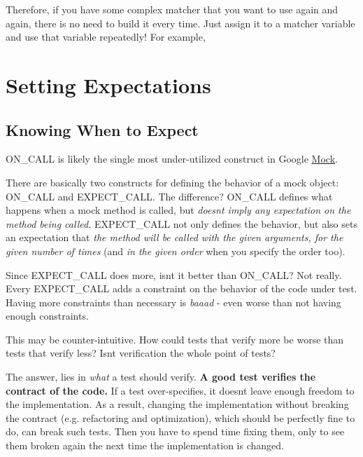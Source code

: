 Therefore, if you have some complex matcher that you want to use again and again, there is no need to build it every time. Just assign it to a matcher variable and use that variable repeatedly! For example,


\begin{DoxyCode}{0}
\end{DoxyCode}


\section*{Setting Expectations}

\subsection*{Knowing When to Expect}

{\ttfamily O\+N\+\_\+\+C\+A\+LL} is likely the single most under-\/utilized construct in Google \mbox{\hyperlink{class_mock}{Mock}}.

There are basically two constructs for defining the behavior of a mock object\+: {\ttfamily O\+N\+\_\+\+C\+A\+LL} and {\ttfamily E\+X\+P\+E\+C\+T\+\_\+\+C\+A\+LL}. The difference? {\ttfamily O\+N\+\_\+\+C\+A\+LL} defines what happens when a mock method is called, but {\itshape doesn\textquotesingle{}t imply any expectation on the method being called.} {\ttfamily E\+X\+P\+E\+C\+T\+\_\+\+C\+A\+LL} not only defines the behavior, but also sets an expectation that {\itshape the method will be called with the given arguments, for the given number of times} (and {\itshape in the given order} when you specify the order too).

Since {\ttfamily E\+X\+P\+E\+C\+T\+\_\+\+C\+A\+LL} does more, isn\textquotesingle{}t it better than {\ttfamily O\+N\+\_\+\+C\+A\+LL}? Not really. Every {\ttfamily E\+X\+P\+E\+C\+T\+\_\+\+C\+A\+LL} adds a constraint on the behavior of the code under test. Having more constraints than necessary is {\itshape baaad} -\/ even worse than not having enough constraints.

This may be counter-\/intuitive. How could tests that verify more be worse than tests that verify less? Isn\textquotesingle{}t verification the whole point of tests?

The answer, lies in {\itshape what} a test should verify. {\bfseries{A good test verifies the contract of the code.}} If a test over-\/specifies, it doesn\textquotesingle{}t leave enough freedom to the implementation. As a result, changing the implementation without breaking the contract (e.\+g. refactoring and optimization), which should be perfectly fine to do, can break such tests. Then you have to spend time fixing them, only to see them broken again the next time the implementation is changed.

